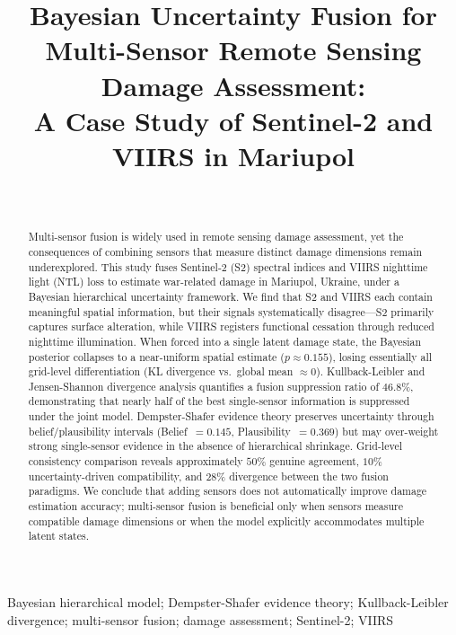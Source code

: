 \documentclass[wcp]{jmlr}
\title[Bayesian Fusion for Multi-Sensor Damage Assessment]{Bayesian Uncertainty Fusion for Multi-Sensor Remote Sensing Damage Assessment:\\A Case Study of Sentinel-2 and VIIRS in Mariupol}
\author{
  \Name{Author Name} \Email{author@university.edu}\\
  \addr{Department of Statistics, University Name}
}
\begin{document}
\makeatletter
\let \@jmlrpages \@empty
\makeatother

\maketitle

\begin{abstract}
Multi-sensor fusion is widely used in remote sensing damage assessment,
yet the consequences of combining sensors that measure distinct damage
dimensions remain underexplored. This study fuses Sentinel-2 (S2) spectral
indices and VIIRS nighttime light (NTL) loss to estimate war-related damage
in Mariupol, Ukraine, under a Bayesian hierarchical uncertainty framework.
We find that S2 and VIIRS each contain meaningful spatial information, but
their signals systematically disagree---S2 primarily captures surface
alteration, while VIIRS registers functional cessation through reduced
nighttime illumination. When forced into a single latent damage state, the
Bayesian posterior collapses to a near-uniform spatial estimate
($p \approx 0.155$), losing essentially all grid-level differentiation
(KL divergence vs.\ global mean $\approx 0$). Kullback-Leibler and
Jensen-Shannon divergence analysis quantifies a fusion suppression ratio of
$46.8\%$, demonstrating that nearly half of the best single-sensor
information is suppressed under the joint model. Dempster-Shafer evidence
theory preserves uncertainty through belief/plausibility intervals
(Belief~$=0.145$, Plausibility~$=0.369$) but may over-weight strong
single-sensor evidence in the absence of hierarchical shrinkage.
Grid-level consistency comparison reveals approximately $50\%$ genuine
agreement, $10\%$ uncertainty-driven compatibility, and $28\%$ divergence
between the two fusion paradigms. We conclude that adding sensors does not
automatically improve damage estimation accuracy; multi-sensor fusion is
beneficial only when sensors measure compatible damage dimensions or when
the model explicitly accommodates multiple latent states.
\end{abstract}

\begin{keywords}
Bayesian hierarchical model; Dempster-Shafer evidence theory;
Kullback-Leibler divergence; multi-sensor fusion; damage assessment;
Sentinel-2; VIIRS
\end{keywords}

\end{document}
